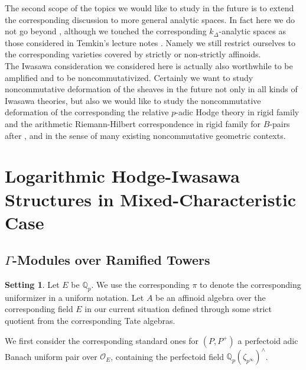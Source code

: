 \documentclass[12pt]{amsart}
\theoremstyle{definition}
\numberwithin{equation}{section}
\newtheorem{setting}[theorem]{Setting}
\begin{document}
The second scope of the topics we would like to study in the future is to extend the corresponding discussion to more general analytic spaces. In fact here we do not go beyond \cite[Chapter 8]{KL16}, although we touched the corresponding $k_\Delta$-analytic spaces as those considered in Temkin's lecture notes \cite[Part I Chapter I]{DFN}. Namely we still restrict ourselves to the corresponding varieties covered by strictly or non-strictly affinoids. \\ 






The Iwasawa consideration we considered here is actually also worthwhile to be amplified and to be noncommutativized. Certainly we want to study noncommutative deformation of the sheaves in the future not only in all kinds of Iwasawa theories, but also we would like to study the noncommutative deformation of the corresponding the relative $p$-adic Hodge theory in rigid family and the arithmetic Riemann-Hilbert correspondence in rigid family for $B$-pairs after \cite{LZ}, \cite{TT} and \cite{Shi} in the sense of many existing noncommutative geometric contexts. 












\newpage

\section{Logarithmic Hodge-Iwasawa Structures in Mixed-Characteristic Case}\label{section3}

\subsection{$\Gamma$-Modules over Ramified Towers}

\begin{setting}
Let $E$ be $\mathbb{Q}_p$. We use the corresponding $\pi$ to denote the corresponding uniformizer in a uniform notation. Let $A$ be an affinoid algebra over the corresponding field $E$ in our current situation defined through some strict quotient from the corresponding Tate algebras.
\end{setting}


\indent We first consider the corresponding standard ones for $(P,P^+)$ a perfectoid adic Banach uniform pair over $\mathcal{O}_E$, containing the perfectoid field $\mathbb{Q}_p(\zeta_{p^\infty})^\wedge$.
\end{document}
